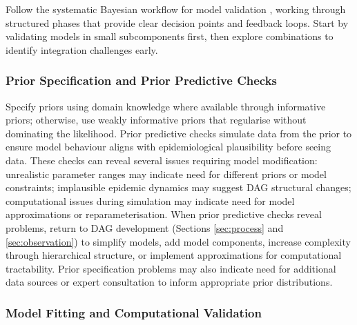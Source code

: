 \documentclass{article}
\begin{document}
Follow the systematic Bayesian workflow for model validation \citep{gelman2020bayesian}, working through structured phases that provide clear decision points and feedback loops.
Start by validating models in small subcomponents first, then explore combinations to identify integration challenges early.

\subsubsection{Prior Specification and Prior Predictive Checks}

Specify priors using domain knowledge where available through informative priors; otherwise, use weakly informative priors that regularise without dominating the likelihood.
Prior predictive checks simulate data from the prior to ensure model behaviour aligns with epidemiological plausibility before seeing data.
These checks can reveal several issues requiring model modification: unrealistic parameter ranges may indicate need for different priors or model constraints; implausible epidemic dynamics may suggest DAG structural changes; computational issues during simulation may indicate need for model approximations or reparameterisation.
When prior predictive checks reveal problems, return to DAG development (Sections \ref{sec:process} and \ref{sec:observation}) to simplify models, add model components, increase complexity through hierarchical structure, or implement approximations for computational tractability.
Prior specification problems may also indicate need for additional data sources or expert consultation to inform appropriate prior distributions.

\subsubsection{Model Fitting and Computational Validation}
\end{document}

